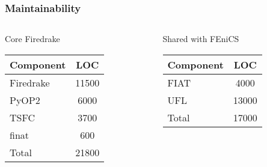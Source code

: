 \documentclass[presentation]{beamer}
\begin{document}
\begin{frame}
  \frametitle{Maintainability}
  \begin{columns}
    \begin{column}[t]{0.5\textwidth}
      \begin{block}{Core Firedrake}
        \begin{table}
          \centering
          \begin{tabular}{lc}
            Component & LOC   \\
            \hline
            Firedrake & 11500 \\
            PyOP2     & 6000  \\
            TSFC      & 3700  \\
            finat     & 600   \\
            \hline
            Total     & 21800
          \end{tabular}
        \end{table}
      \end{block}
    \end{column}
    \begin{column}[t]{0.5\textwidth}
      \begin{block}{Shared with FEniCS}
        \begin{table}
          \centering
          \begin{tabular}{lc}
            Component & LOC   \\
            \hline
            FIAT      & 4000  \\
            UFL       & 13000 \\
            \hline
            Total     & 17000
          \end{tabular}
        \end{table}        
      \end{block}
    \end{column}
  \end{columns}
\end{frame}
\end{document}
